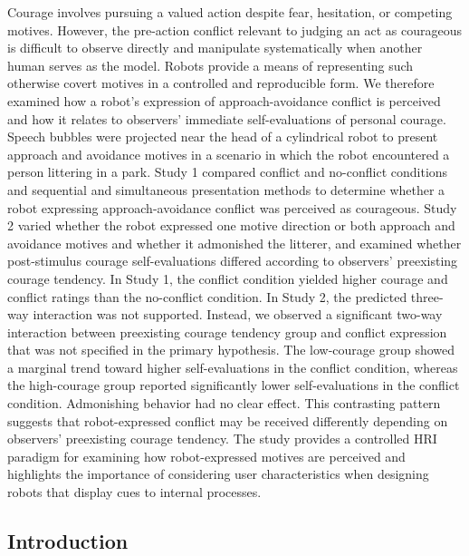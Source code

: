 Courage involves pursuing a valued action despite fear, hesitation, or
competing motives. However, the pre-action conflict relevant to judging
an act as courageous is difficult to observe directly and manipulate
systematically when another human serves as the model. Robots provide a
means of representing such otherwise covert motives in a controlled and
reproducible form. We therefore examined how a robot's expression of
approach-avoidance conflict is perceived and how it relates to
observers' immediate self-evaluations of personal courage. Speech
bubbles were projected near the head of a cylindrical robot to present
approach and avoidance motives in a scenario in which the robot
encountered a person littering in a park. Study 1 compared conflict and
no-conflict conditions and sequential and simultaneous presentation
methods to determine whether a robot expressing approach-avoidance
conflict was perceived as courageous. Study 2 varied whether the robot
expressed one motive direction or both approach and avoidance motives
and whether it admonished the litterer, and examined whether
post-stimulus courage self-evaluations differed according to observers'
preexisting courage tendency. In Study 1, the conflict condition yielded
higher courage and conflict ratings than the no-conflict condition. In
Study 2, the predicted three-way interaction was not supported. Instead,
we observed a significant two-way interaction between preexisting
courage tendency group and conflict expression that was not specified in
the primary hypothesis. The low-courage group showed a marginal trend
toward higher self-evaluations in the conflict condition, whereas the
high-courage group reported significantly lower self-evaluations in the
conflict condition. Admonishing behavior had no clear effect. This
contrasting pattern suggests that robot-expressed conflict may be
received differently depending on observers' preexisting courage
tendency. The study provides a controlled HRI paradigm for examining how
robot-expressed motives are perceived and highlights the importance of
considering user characteristics when designing robots that display cues
to internal processes.

\subsection{Introduction}\label{introduction}

